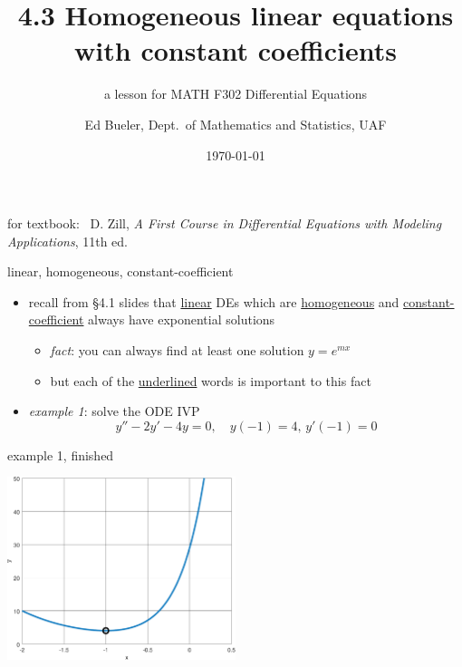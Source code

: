 \documentclass{beamer}
\title{4.3 Homogeneous linear equations \\ with constant coefficients}
\subtitle{a lesson for MATH F302 Differential Equations}
\author{Ed Bueler, Dept.~of Mathematics and Statistics, UAF}
\date{\tiny \today}
\begin{document}


\begin{frame}
\titlepage

\centerline{\tiny for textbook: \, D. Zill, \emph{A First Course in Differential Equations with Modeling Applications}, 11th ed.}
\end{frame}


\begin{frame}{linear, homogeneous, constant-coefficient}

\begin{itemize}
\item recall from \S4.1 slides that \underline{linear} DEs which are \underline{homogeneous} and \underline{constant-coefficient} always have exponential solutions
    \begin{itemize}
    \item \emph{fact}: you can always find at least one solution $y=e^{mx}$
    \item but each of the \underline{underlined} words is important to this fact
    \end{itemize}
\item \emph{example 1}: solve the ODE IVP
    $$y'' -2 y' - 4 y = 0, \quad y(-1)=4, \, y'(-1)=0$$

\vspace{30mm}
\end{itemize}
\end{frame}


\begin{frame}{example 1, finished}

\vspace{35mm}

\hfill \includegraphics[width=0.5\textwidth]{figs/expodeivp2nd}
\end{frame}
\end{document}
